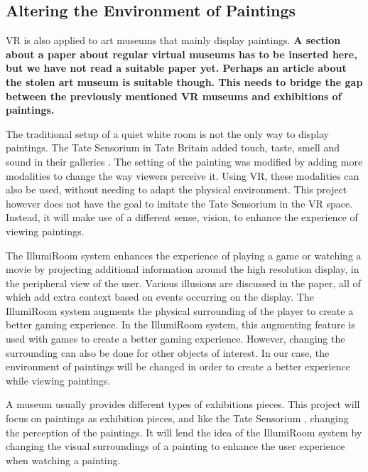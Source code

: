 \documentclass[a4paper]{article}
\begin{document}
\subsection{Altering the Environment of Paintings}
VR is also applied to art museums that mainly display paintings.
\textbf{A section about a paper about regular virtual museums has to be inserted here, but we have not read a suitable paper yet. Perhaps an article about the stolen art museum is suitable though. This needs to bridge the gap between the previously mentioned VR museums and exhibitions of paintings.}

The traditional setup of a quiet white room is not the only way to display paintings. The Tate Sensorium \cite{tate1} in Tate Britain added touch, taste, smell and sound in their galleries \cite{tate2}. The setting of the painting was modified by adding more modalities to change the way viewers perceive it. Using VR, these modalities can also be used, without needing to adapt the physical environment. This project however does not have the goal to imitate the Tate Sensorium in the VR space. Instead, it will make use of a different sense, vision, to enhance the experience of viewing paintings.

The IllumiRoom system \cite{illumiroom} enhances the experience of playing a game or watching a movie by projecting additional information around the high resolution display, in the peripheral view of the user. Various illusions are discussed in the paper, all of which add extra context based on events occurring on the display. The IllumiRoom system augments the physical surrounding of the player to create a better gaming experience. In the IllumiRoom system, this augmenting feature is used with games to create a better gaming experience. However, changing the surrounding can also be done for other objects of interest. In our case, the environment of paintings will be changed in order to create a better experience while viewing paintings.



A museum usually provides different types of exhibitions pieces. This project will focus on paintings as exhibition pieces, and like the Tate Sensorium \cite{tate2}, changing the perception of the paintings. It will lend the idea of the IllumiRoom system \cite{illumiroom} by changing the visual surroundings of a painting to enhance the user experience when watching a painting. 
\end{document}
